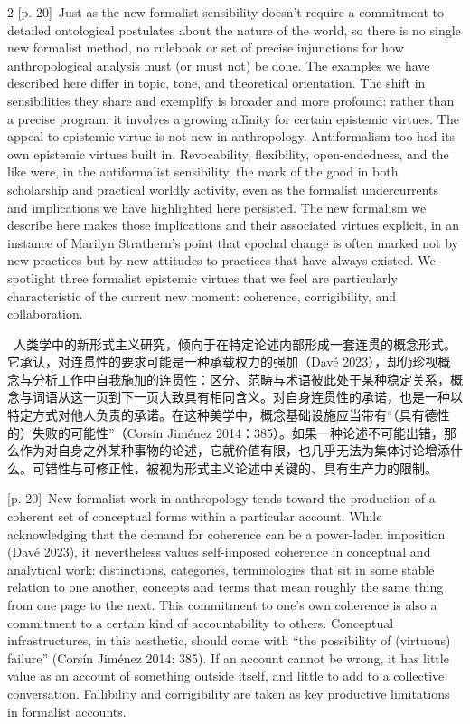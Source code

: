 \documentclass[10pt,a4paper]{article}
\begin{document}
\begin{paracol}{2}
{\scriptsize\color{gray} [p. 20]}\ Just as the new formalist sensibility doesn’t require a commitment to detailed ontological postulates about the nature of the world, so there is no single new formalist method, no rulebook or set of precise injunctions for how anthropological analysis must (or must not) be done. The examples we have described here differ in topic, tone, and theoretical orientation. The shift in sensibilities they share and exemplify is broader and more profound: rather than a precise program, it involves a growing affinity for certain epistemic virtues. The appeal to epistemic virtue is not new in anthropology. Antiformalism too had its own epistemic virtues built in. Revocability, flexibility, open-endedness, and the like were, in the antiformalist sensibility, the mark of the good in both scholarship and practical worldly activity, even as the formalist undercurrents and implications we have highlighted here persisted. The new formalism we describe here makes those implications and their associated virtues explicit, in an instance of Marilyn Strathern’s point that epochal change is often marked not by new practices but by new attitudes to practices that have always existed. We spotlight three formalist epistemic virtues that we feel are particularly characteristic of the current new moment: coherence, corrigibility, and collaboration.\par
\switchcolumn*
{\scriptsize\color{gray} [p. 20]}\ 人类学中的新形式主义研究，倾向于在特定论述内部形成一套连贯的概念形式。它承认，对连贯性的要求可能是一种承载权力的强加（Davé 2023），却仍珍视概念与分析工作中自我施加的连贯性：区分、范畴与术语彼此处于某种稳定关系，概念与词语从这一页到下一页大致具有相同含义。对自身连贯性的承诺，也是一种以特定方式对他人负责的承诺。在这种美学中，概念基础设施应当带有“（具有德性的）失败的可能性”（Corsín Jiménez 2014：385）。如果一种论述不可能出错，那么作为对自身之外某种事物的论述，它就价值有限，也几乎无法为集体讨论增添什么。可错性与可修正性，被视为形式主义论述中关键的、具有生产力的限制。\par
\switchcolumn
{\scriptsize\color{gray} [p. 20]}\ New formalist work in anthropology tends toward the production of a coherent set of conceptual forms within a particular account. While acknowledging that the demand for coherence can be a power-laden imposition (Davé 2023), it nevertheless values self-imposed coherence in conceptual and analytical work: distinctions, categories, terminologies that sit in some stable relation to one another, concepts and terms that mean roughly the same thing from one page to the next. This commitment to one’s own coherence is also a commitment to a certain kind of accountability to others. Conceptual infrastructures, in this aesthetic, should come with “the possibility of (virtuous) failure” (Corsín Jiménez 2014: 385). If an account cannot be wrong, it has little value as an account of something outside itself, and little to add to a collective conversation. Fallibility and corrigibility are taken as key productive limitations in formalist accounts.\par

\end{paracol}
\end{document}
